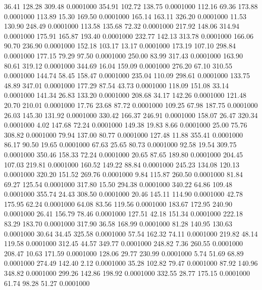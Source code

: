   36.41  128.28  309.48   0.0001000
 354.91  102.72  138.75   0.0001000
 112.16   69.36  173.88   0.0001000
 113.89   15.30  169.50   0.0001000
 165.14  163.11  326.20   0.0001000
  11.53  130.90  248.49   0.0001000
 113.58  135.68   72.32   0.0001000
 217.92  148.06  314.94   0.0001000
 175.91  165.87  193.40   0.0001000
 232.77  142.13  313.78   0.0001000
 166.06   90.70  236.90   0.0001000
 152.18  103.17   13.17   0.0001000
 173.19  107.10  298.84   0.0001000
 177.15   79.29   97.50   0.0001000
 250.00   83.99  317.43   0.0001000
 163.90   80.61  319.12   0.0001000
 344.69   16.04  159.09   0.0001000
 276.20   67.10  310.55   0.0001000
 144.74   58.45  158.47   0.0001000
 235.04  110.09  298.61   0.0001000
 133.75   48.89  347.01   0.0001000
 177.29   87.54   43.73   0.0001000
 118.09  151.08   33.14   0.0001000
 141.34   26.83  133.20   0.0001000
 208.68   34.17  142.26   0.0001000
 121.48   20.70  210.01   0.0001000
  17.76   23.68   87.72   0.0001000
 109.25   67.98  187.75   0.0001000
  26.03  145.30  131.92   0.0001000
 330.42  166.37  246.91   0.0001000
 158.07   26.47  320.34   0.0001000
   4.02  147.68   72.24   0.0001000
 149.38   19.83    8.66   0.0001000
  25.00   75.76  308.82   0.0001000
  79.94  137.00   80.77   0.0001000
 127.48   11.88  355.41   0.0001000
  86.17   90.50   19.65   0.0001000
  67.63   25.65   80.73   0.0001000
  92.58   19.54  309.75   0.0001000
 350.46  158.33   72.24   0.0001000
  20.65   87.65  189.80   0.0001000
 204.45  107.03  219.81   0.0001000
 160.52  149.22   88.84   0.0001000
 245.23  134.08  120.13   0.0001000
 320.20  151.52  269.76   0.0001000
   9.84  115.87  260.50   0.0001000
  81.84   69.27  125.54   0.0001000
 317.80   15.50  294.38   0.0001000
 340.22   64.86  109.48   0.0001000
 355.74   24.43  308.50   0.0001000
  20.46  145.11  114.90   0.0001000
  42.78  175.95   62.24   0.0001000
  64.08   83.56  119.56   0.0001000
 183.67  172.95  240.90   0.0001000
  26.41  156.79   78.46   0.0001000
 127.51   42.18  151.34   0.0001000
 222.18   83.29  183.70   0.0001000
 317.90   36.58  168.99   0.0001000
  81.28  140.95  130.63   0.0001000
  30.64   34.45  325.58   0.0001000
  57.54  162.32   74.11   0.0001000
 219.82   48.14  119.58   0.0001000
 312.45   44.57  349.77   0.0001000
 248.82    7.36  260.55   0.0001000
 208.47   10.63  171.59   0.0001000
 128.06   29.77  230.99   0.0001000
   5.74   51.69   68.89   0.0001000
 274.49  142.40    2.12   0.0001000
  35.28  102.82   79.47   0.0001000
  87.92  140.96  348.82   0.0001000
 299.26  142.86  198.92   0.0001000
 332.55   28.77  175.15   0.0001000
  61.74   98.28   51.27   0.0001000
